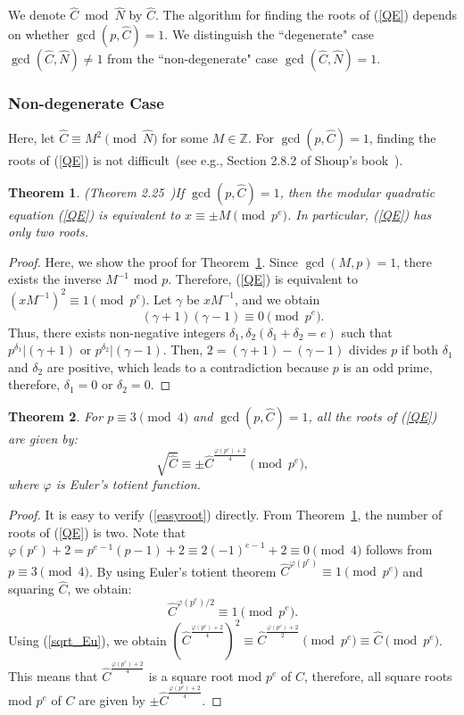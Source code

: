 \documentclass{article}
\newtheorem{thm}{Theorem}
\begin{document}
We denote $\hat{C}\bmod\hat{N}$ by $\hat{C}$. 
The algorithm for finding the roots of (\ref{QE}) depends on whether $\gcd(p,\hat{C})=1$. 
We distinguish the ``degenerate" case $\gcd(\hat{C},\hat{N})\ne 1$ 
from the ``non-degenerate" case $\gcd(\hat{C},\hat{N})= 1$.

\subsubsection{Non-degenerate Case}

Here, let $\hat{C}\equiv M^2\pmod{\hat{N}}$ for some $M\in\mathbb{Z}$.
For $\gcd(p,\hat{C})=1$, finding the roots of (\ref{QE}) 
is not difficult~(see e.g., Section 2.8.2 of Shoup's book~\cite{Shoup_book}). 
\begin{thm}(Theorem 2.25~\cite{Shoup_book})\label{justtwo}
If $\gcd(p,\hat{C})=1$, then the modular quadratic equation (\ref{QE}) 
is equivalent to $x\equiv \pm M\pmod{p^e}$. 
In particular, (\ref{QE}) has only two roots.
\end{thm}
\begin{proof}
Here, we show the proof for Theorem~\ref{justtwo}. 
Since $\gcd(M,p)=1$, there exists the inverse $M^{-1}$ mod $p$. 
Therefore, (\ref{QE}) is equivalent to $(xM^{-1})^2 \equiv 1\pmod{p^e}$.
Let $\gamma$ be $xM^{-1}$, and we obtain
$$
(\gamma+1)(\gamma-1)\equiv 0\pmod{p^e}.
$$
Thus, there exists non-negative integers $\delta_1, \delta_2(\delta_1+\delta_2=e)$ such that 
$p^{\delta_1}|(\gamma+1)$ or $p^{\delta_2}|(\gamma-1)$. 
Then, $2=(\gamma+1)-(\gamma-1)$ divides $p$ if both $\delta_1$ and $\delta_2$ are positive, 
which leads to a contradiction because $p$ is an odd prime, therefore, 
$\delta_1=0$ or $\delta_2=0$.
\end{proof}

\begin{thm}
For $p\equiv 3\pmod{4}$ and $\gcd(p,\hat{C})=1$, all the roots of (\ref{QE}) are given by:
\begin{equation}\label{easyroot}
\sqrt{\hat{C}} \equiv \pm \hat{C}^{\frac{\varphi(p^e)+2}{4}}\pmod{p^e},
\end{equation}
where $\varphi$ is Euler's totient function.
\end{thm}
\begin{proof}
It is easy to verify (\ref{easyroot}) directly. 
From Theorem~\ref{justtwo}, the number of roots of (\ref{QE}) is two. 
Note that $\varphi(p^e)+2=p^{e-1}(p-1)+2\equiv 2(-1)^{e-1}+2\equiv 0\pmod{4}$ follows from 
$p\equiv 3\pmod{4}$.
By using Euler's totient theorem $\hat{C}^{\varphi(p^e)}\equiv 1\pmod{p^e}$ and squaring $\hat{C}$, we obtain:
\begin{equation}\label{sqrt_Eu}
\hat{C}^{\varphi(p^e)/2}\equiv 1\pmod{p^e}.
\end{equation}
Using (\ref{sqrt_Eu}), we obtain
$(\hat{C}^{\frac{\varphi(p^e)+2}{4}})^2 \equiv \hat{C}^{\frac{\varphi(p^e)+2}{2}}\pmod{p^e} \equiv \hat{C}\pmod{p^e}$.
This means that $\hat{C}^{\frac{\varphi(p^e)+2}{4}}$ is a square root mod $p^e$ of $\hat{C}$, 
therefore, all square roots mod $p^e$ of $C$ are given by $\pm \hat{C}^{\frac{\varphi(p^e)+2}{4}}$.
\end{proof}
\end{document}
